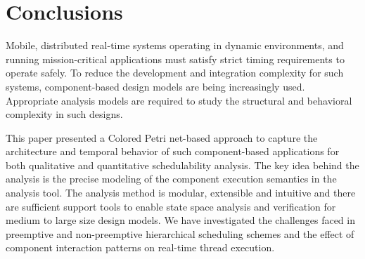 \section{Conclusions}
\label{sec:Conclusions}

Mobile, distributed real-time systems operating in dynamic environments, and running mission-critical applications must satisfy strict timing requirements to operate safely. To reduce the development and integration complexity for such systems, component-based design models are being increasingly used. Appropriate analysis models are required to study the structural and behavioral complexity in such designs. 

This paper presented a Colored Petri net-based approach to capture the architecture and temporal behavior of such component-based applications for both qualitative and quantitative schedulability analysis. The key idea behind the analysis is the precise modeling of the component execution semantics in the analysis tool. The analysis method is modular, extensible and intuitive and there are sufficient support tools to enable state space analysis and verification for medium to large size design models. We have  investigated the challenges faced in preemptive and non-preemptive hierarchical scheduling schemes and the effect of component interaction patterns on real-time thread execution. 



